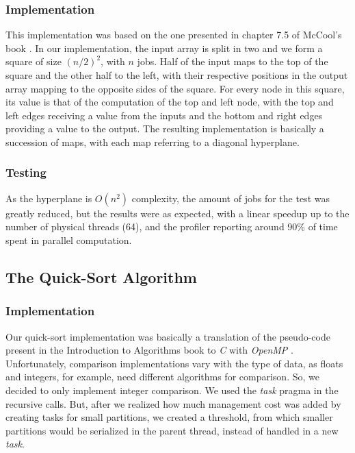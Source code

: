 \documentclass[10pt,journal]{IEEEtran}
\begin{document}
\subsubsection{Implementation}

This implementation was based on the one presented in chapter 7.5 of McCool's book \cite{mccool}. In our implementation, the input array is split in two and we form a square of size $ (n / 2)^2 $, with $ n $ jobs. Half of the input maps to the top of the square and the other half to the left, with their respective positions in the output array mapping to the opposite sides of the square. For every node in this square, its value is that of the computation of the top and left node, with the top and left edges receiving a value from the inputs and the bottom and right edges providing a value to the output. The resulting implementation is basically a succession of maps, with each map referring to a diagonal hyperplane. 

\subsubsection{Testing}

As the hyperplane is $ O(n^2) $ complexity, the amount of jobs for the test was greatly reduced, but the results were as expected, with a linear speedup up to the number of physical threads (64), and the profiler reporting around 90\% of time spent in parallel computation.

\subsection{The Quick-Sort Algorithm}

\subsubsection{Implementation}

Our quick-sort implementation was basically a translation of the pseudo-code present in the Introduction to Algorithms book to \textit{C} with \textit{OpenMP} \cite{introalgs}. Unfortunately, comparison implementations vary with the type of data, as floats and integers, for example, need different algorithms for comparison. So, we decided to only implement integer comparison. We used the \textit{task} pragma in the recursive calls. But, after we realized how much management cost was added by creating tasks for small partitions, we created a threshold, from which smaller partitions would be serialized in the parent thread, instead of handled in a new \textit{task}. 
\end{document}
